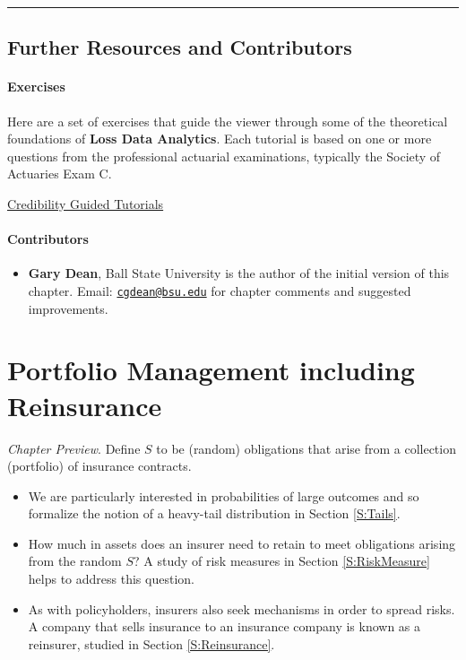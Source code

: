 \documentclass[]{book}
\providecommand{\tightlist}{%
  \setlength{\itemsep}{0pt}\setlength{\parskip}{0pt}}
\theoremstyle{definition}
\theoremstyle{definition}
\theoremstyle{definition}
\theoremstyle{remark}
\begin{document}
\begin{center}\rule{0.5\linewidth}{\linethickness}\end{center}

\section{Further Resources and
Contributors}\label{Cred-further-reading-and-resources}

\subsubsection*{Exercises}\label{exercises-5}

Here are a set of exercises that guide the viewer through some of the
theoretical foundations of \textbf{Loss Data Analytics}. Each tutorial
is based on one or more questions from the professional actuarial
examinations, typically the Society of Actuaries Exam C.

\href{https://www.ssc.wisc.edu/~jfrees/loss-data-analytics/loss-data-analyticscredibility-guided-tutorials/}{Credibility
Guided Tutorials}

\subsubsection*{Contributors}\label{contributors-5}

\begin{itemize}
\tightlist
\item
  \textbf{Gary Dean}, Ball State University is the author of the initial
  version of this chapter. Email:
  \href{mailto:cgdean@bsu.edu}{\nolinkurl{cgdean@bsu.edu}} for chapter
  comments and suggested improvements.
\end{itemize}

\chapter{Portfolio Management including Reinsurance}\label{C:PortMgt}

\emph{Chapter Preview}. Define \(S\) to be (random) obligations that
arise from a collection (portfolio) of insurance contracts.

\begin{itemize}
\item
  We are particularly interested in probabilities of large outcomes and
  so formalize the notion of a heavy-tail distribution in Section
  \ref{S:Tails}.
\item
  How much in assets does an insurer need to retain to meet obligations
  arising from the random \(S\)? A study of risk measures in Section
  \ref{S:RiskMeasure} helps to address this question.
\item
  As with policyholders, insurers also seek mechanisms in order to
  spread risks. A company that sells insurance to an insurance company
  is known as a reinsurer, studied in Section \ref{S:Reinsurance}.
\end{itemize}
\end{document}
